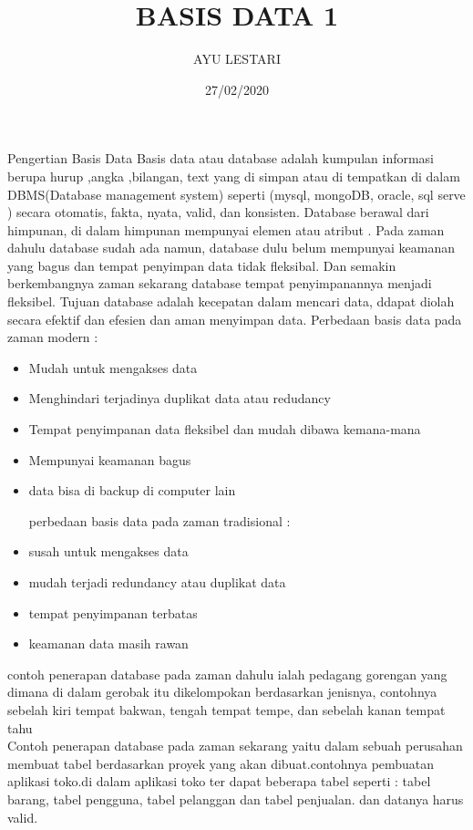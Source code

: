 \documentclass[12pt]{article}
\title{BASIS DATA 1}
\author{AYU LESTARI}
\date{27/02/2020}
\begin{document}
\maketitle
Pengertian Basis Data
Basis data atau database adalah kumpulan informasi berupa  hurup ,angka ,bilangan, text yang di simpan atau di tempatkan di dalam DBMS(Database management system)  seperti (mysql, mongoDB, oracle, sql serve ) secara otomatis, fakta, nyata, valid, dan konsisten. Database berawal dari himpunan, di dalam himpunan mempunyai  elemen atau atribut .  Pada zaman dahulu database sudah ada namun, database dulu belum mempunyai keamanan yang bagus dan tempat penyimpan data tidak fleksibal. Dan semakin berkembangnya zaman  sekarang database tempat penyimpanannya menjadi fleksibel. Tujuan database adalah kecepatan dalam mencari data, ddapat diolah secara efektif dan efesien  dan aman menyimpan data.
Perbedaan   basis data  pada zaman modern :


\begin{itemize}
  \item	Mudah untuk  mengakses data 
  \item Menghindari terjadinya duplikat data atau redudancy
  \item Tempat penyimpanan data  fleksibel dan mudah dibawa kemana-mana
  \item Mempunyai  keamanan bagus
  \item data bisa di backup di computer lain\\

\maketitle perbedaan   basis data pada zaman  tradisional :
  \item	susah untuk mengakses data 
  \item	mudah terjadi redundancy atau duplikat data
  \item tempat penyimpanan terbatas
  \item keamanan data masih rawan
\end{itemize}
\maketitle
contoh penerapan  database pada zaman dahulu ialah pedagang gorengan yang dimana di dalam gerobak itu dikelompokan berdasarkan jenisnya, contohnya sebelah kiri tempat bakwan, tengah tempat tempe, dan sebelah kanan tempat tahu\\
Contoh penerapan database pada zaman sekarang yaitu dalam sebuah perusahan membuat tabel berdasarkan proyek yang akan dibuat.contohnya pembuatan aplikasi toko.di dalam aplikasi toko ter dapat beberapa tabel seperti : tabel  barang, tabel pengguna, tabel pelanggan dan tabel penjualan. dan datanya harus valid.
\end{document}

